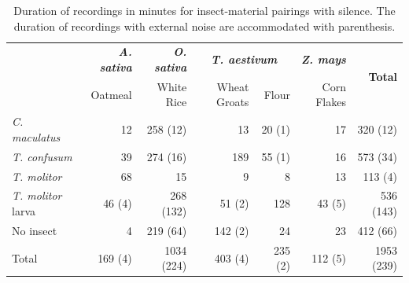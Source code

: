 \documentclass[../Vibro-Acoustic Signatures and Detection Algorithms for Stored Product Insects.tex]{subfiles}
\begin{document}
\begin{table}[!htbp]
	\caption[Duration of recordings for insect-material pairings]{Duration of recordings in minutes for insect-material pairings with silence. The duration of recordings with external noise are accommodated with parenthesis. \label{tab:recording}}
	\centering
	\small
	\begin{tabular}{@{}l*{6}{r}@{}}
		\toprule
		                          & \textbf{\textit{A. sativa}} & \textbf{\textit{O. sativa}} & \multicolumn{2}{c}{\textbf{\textit{T. aestivum}}} & \textbf{\textit{Z. mays}} & \multirow{2}{*}{\textbf{Total}}              \\
		                          & Oatmeal                     & White Rice                  & Wheat Groats                                      & Flour                     & Corn Flakes                     &            \\
		\midrule
		\textit{C. maculatus}     & 12                          & 258 (12)                    & 13                                                & 20 (1)                    & 17                              & 320 (12)   \\
		\textit{T. confusum}      & 39                          & 274 (16)                    & 189                                               & 55 (1)                    & 16                              & 573 (34)   \\
		\textit{T. molitor}       & 68                          & 15                          & 9                                                 & 8                         & 13                              & 113 (4)    \\
		\textit{T. molitor} larva & 46 (4)                      & 268 (132)                   & 51 (2)                                            & 128                       & 43 (5)                          & 536 (143)  \\
		\midrule
		No insect                 & 4                           & 219 (64)                    & 142 (2)                                           & 24                        & 23                              & 412 (66)   \\
		\midrule
		Total                     & 169 (4)                     & 1034 (224)                  & 403 (4)                                           & 235 (2)                   & 112 (5)                         & 1953 (239) \\
		\bottomrule
	\end{tabular}
\end{table}
\end{document}
